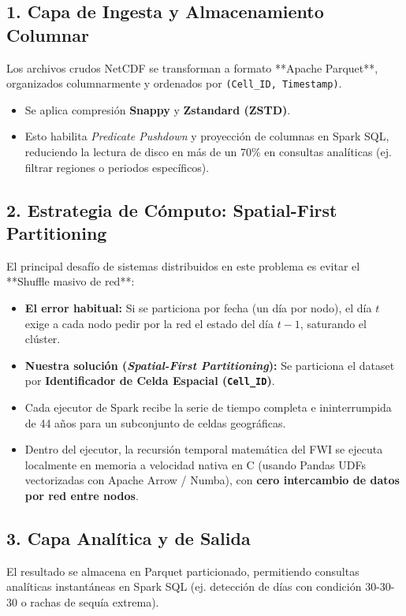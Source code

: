 \documentclass[11pt,a4paper]{article}
\begin{document}
\subsection{1. Capa de Ingesta y Almacenamiento Columnar}
Los archivos crudos NetCDF se transforman a formato **Apache Parquet**, organizados columnarmente y ordenados por \texttt{(Cell\_ID, Timestamp)}.
\begin{itemize}[leftmargin=5mm]
    \item Se aplica compresión \textbf{Snappy} y \textbf{Zstandard (ZSTD)}.
    \item Esto habilita \textit{Predicate Pushdown} y proyección de columnas en Spark SQL, reduciendo la lectura de disco en más de un 70\% en consultas analíticas (ej. filtrar regiones o periodos específicos).
\end{itemize}

\subsection{2. Estrategia de Cómputo: Spatial-First Partitioning}
El principal desafío de sistemas distribuidos en este problema es evitar el **Shuffle masivo de red**:
\begin{itemize}[leftmargin=5mm]
    \item \textbf{El error habitual:} Si se particiona por fecha (un día por nodo), el día $t$ exige a cada nodo pedir por la red el estado del día $t-1$, saturando el clúster.
    \item \textbf{Nuestra solución (\textit{Spatial-First Partitioning}):} Se particiona el dataset por \textbf{Identificador de Celda Espacial (\texttt{Cell\_ID})}.
    \item Cada ejecutor de Spark recibe la serie de tiempo completa e ininterrumpida de 44 años para un subconjunto de celdas geográficas.
    \item Dentro del ejecutor, la recursión temporal matemática del FWI se ejecuta localmente en memoria a velocidad nativa en C (usando Pandas UDFs vectorizadas con Apache Arrow / Numba), con \textbf{cero intercambio de datos por red entre nodos}.
\end{itemize}

\subsection{3. Capa Analítica y de Salida}
El resultado se almacena en Parquet particionado, permitiendo consultas analíticas instantáneas en Spark SQL (ej. detección de días con condición 30-30-30 o rachas de sequía extrema).
\end{document}
